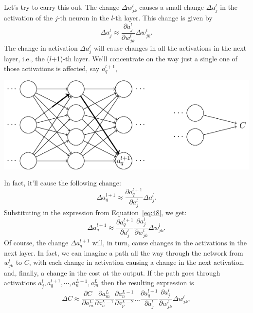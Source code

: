 \documentclass[a4paper,twoside,10pt]{book}
\begin{document}
Let's try to carry this out. The change $\Delta{}w^l_{jk}$ causes a small change $\Delta{}a^l_j$ in the activation of the $j$-th neuron in the $l$-th layer. This change is given by
\begin{equation}
	\Delta a^l_j \approx \frac{\partial a^l_j}{\partial w^l_{jk}} \Delta w^l_{jk}.
	\label{eq:48}
\end{equation}
The change in activation $\Delta{}a^l_j$ will cause changes in all the activations in the next layer, i.e., the ($l$+1)-th layer. We'll concentrate on the way just a single one of those activations is affected, say $a^{l+1}_q$,
\begin{center}
	\includegraphics[scale=0.5]{./figures/ch2/tikz26}
\end{center}
In fact, it'll cause the following change:
\begin{equation}
	\Delta a^{l+1}_q \approx \frac{\partial a^{l+1}_q}{\partial a^l_j} \Delta a^l_j.
	\label{eq:49}
\end{equation}%
Substituting in the expression from Equation~\ref{eq:48}, we get:
\begin{equation}
	\Delta a^{l+1}_q \approx \frac{\partial a^{l+1}_q}{\partial a^l_j} \frac{\partial a^l_j}{\partial w^l_{jk}} \Delta w^l_{jk}.
	\label{eq:50}
\end{equation}
Of course, the change $\Delta{}a^{l+1}_q$ will, in turn, cause changes in the activations in the next layer. In fact, we can imagine a path all the way through the network from $w^l_{jk}$ to $C$, with each change in activation causing a change in the next activation, and, finally, a change in the cost at the output. If the path goes through activations $a^l_j,a^{l+1}_q,\cdots,a^{L-1}_n,a^L_m$ then the resulting expression is
\begin{equation}
	\Delta C \approx \frac{\partial C}{\partial a^L_m} 
	\frac{\partial a^L_m}{\partial a^{L-1}_n}
	\frac{\partial a^{L-1}_n}{\partial a^{L-2}_p} \ldots
	\frac{\partial a^{l+1}_q}{\partial a^l_j}
	\frac{\partial a^l_j}{\partial w^l_{jk}} \Delta w^l_{jk},
	\label{eq:51}
\end{equation}
\end{document}

